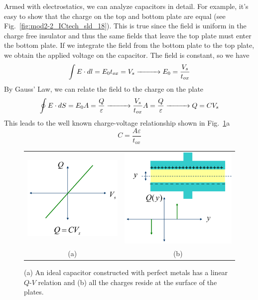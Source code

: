 Armed with electrostatics, we can analyze capacitors in detail.  For example, it's easy to show that the charge on the top and bottom plate are equal (see Fig.~\ref{fig:mod2-2_ICtech_sld_18}).  This is true since the field is uniform in the charge free insulator and thus the same fields that leave the top plate must enter the bottom plate.
%
If we integrate the field from the bottom plate to the top plate, we obtain the applied voltage on the capacitor.  The field is constant, so we have
\begin{equation} 
	\int {E \cdot dl}  = {E_0}{t_{ox}} = {V_s}  \xrightarrow{\hspace*{1cm}}
	{E_0} = \frac{{{V_s}}}{{{t_{ox}}}} 
\end{equation}
%
By Gauss' Law, we can relate the field to the charge on the plate
\begin{equation} 
	\oint {E \cdot dS = {E_0}A = \frac{Q}{\varepsilon }}  \xrightarrow{\hspace*{1cm}}
	\frac{{{V_s}}}{{{t_{ox}}}}A = \frac{Q}{\varepsilon } \xrightarrow{\hspace*{1cm}}
	Q = C{V_s}
\end{equation}
%
This leads to the well known charge-voltage relationship shown in Fig.~\ref{fig:mod2-2_ICtech_sld_19}a
\begin{equation} 
	C = \frac{{A\varepsilon }}{{{t_{ox}}}}
\end{equation}


\begin{figure}[tb]
\begin{center}
\begin{tabular}{cc}
\includegraphics[width=.35\columnwidth]{mod2-2_ICtech_sld_19} &
\includegraphics[width=.35\columnwidth]{mod2-2_ICtech_sld_19b} \\
(a) & (b) \\
\end{tabular}
\end{center}
\caption{(a) An ideal capacitor constructed with perfect metals has a linear $Q$-$V$ relation and (b) all the charges reside at the surface of the plates.} \label{fig:mod2-2_ICtech_sld_19}
\end{figure}

